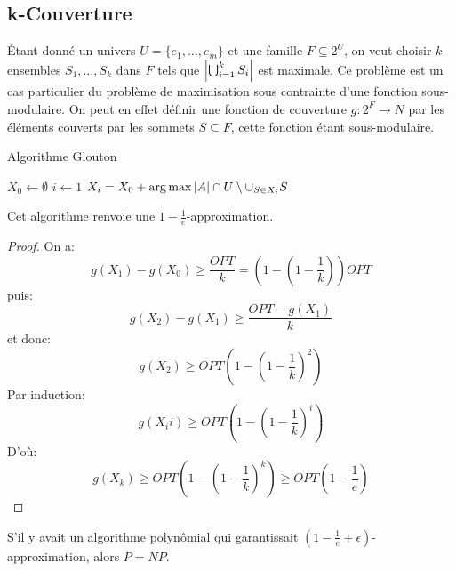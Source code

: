 \documentclass[math, info]{cours}
\begin{document}
\subsection{k-Couverture}
Étant donné un univers $U = \{e_{1}, \ldots, e_{m}\}$ et une famille $F \subseteq 2^{U}$, on veut choisir $k$ ensembles $S_{1}, \ldots, S_{k}$ dans $F$ tels que $\left|\bigcup_{i = 1}^{k} S_{i}\right|$ est maximale.
Ce problème est un cas particulier du problème de maximisation sous contrainte d'une fonction sous-modulaire.
On peut en effet définir une fonction de couverture $g: 2^{F} \to N$ par les éléments couverts par les sommets $S \subseteq F$, cette fonction étant sous-modulaire.
\begin{algorithm}
	\caption{Algorithme Glouton}
	\begin{algorithmic}
		\State $X_{0} \gets \emptyset$
		\State $i \gets 1$
		\State $X_{i} = X_{0} + \arg\max \left|A\right| \cap U\setminus \cup_{S \in X_{i}} S$
		\EndWhile
	\end{algorithmic}
\end{algorithm}
\begin{thm}
	Cet algorithme renvoie une $1 - \frac{1}{e}$-approximation.
\end{thm}
\begin{proof}
On a:
\begin{equation*}
	g(X_{1}) - g(X_{0}) \geq \frac{OPT}{k} = \left(1 - \left( 1 - \frac{1}{k} \right) \right)OPT
\end{equation*}
puis:
\begin{equation*}
	g(X_{2}) - g(X_{1}) \geq \frac{OPT - g(X_{1})}{k}
\end{equation*}
et donc:
\begin{equation*}
	g(X_{2}) \geq OPT(1 - \left(1 - \frac{1}{k}\right)^{2})
\end{equation*}
Par induction:
\begin{equation*}
	g(X_{i}i) \geq OPT(1 - \left(1 - \frac{1}{k}\right)^{i})
\end{equation*}
D'où:
\begin{equation*}
	g(X_{k}) \geq OPT(1 - \left(1 - \frac{1}{k}\right)^{k}) \geq OPT(1 - \frac{1}{e})
\end{equation*}
\end{proof}

\begin{thm}[Feige]
	S'il y avait un algorithme polynômial qui garantissait $\left(1 - \frac{1}{e} + \epsilon\right)$-approximation, alors $P = NP$.
\end{thm}
\end{document}
